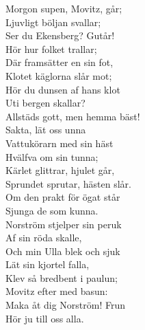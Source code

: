 \documentclass[a6paper,10pt]{article}
\begin{document}
\begin{lyrics}
\newpage
\setlength{\oddsidemargin}{-0.47in}
\noindent
Morgon supen, Movitz, går;\\
Ljuvligt böljan svallar;\\
Ser du Ekensberg? Gutår!\\
Hör hur folket trallar;\\
Där framsätter en sin fot,\\
Klotet käglorna slår mot;\\
Hör du dunsen af hans klot\\
Uti bergen skallar?
\vspace{5pt}\\
Allstäds gott, men hemma bäst!\\
Sakta, lät oss unna\\
Vattukörarn med sin häst\\
Hvälfva om sin tunna;\\
Kärlet glittrar, hjulet går,\\
Sprundet sprutar, hästen slår.\\
Om den prakt för ögat står\\
Sjunga de som kunna.
\vspace{5pt}\\
Norström stjelper sin peruk\\
Af sin röda skalle,\\
Och min Ulla blek och sjuk\\
Lät sin kjortel falla,\\
Klev så bredbent i paulun;\\
Movitz efter med basun:\\
Maka åt dig Norström! Frun\\
Hör ju till oss alla.
\end{lyrics}
\end{document}
